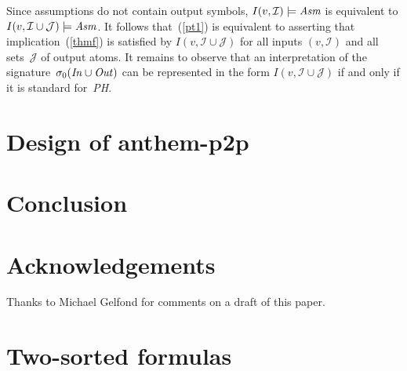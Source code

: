 \documentclass{article}
\newcommand{\I}{\mathcal{I}}
\newcommand{\J}{\mathcal{J}}
\begin{document}
Since assumptions do not contain output symbols,
$I(v,\I)\models\emph{Asm}$ is equivalent to $I(v,\I\cup\J)\models\emph{Asm}$.
It follows that~(\ref{pt1}) is equivalent to asserting that
implication~(\ref{thmf}) is satisfied by $I(v,\I\cup\J)$ for all
inputs $(v,\I)$ and all sets~$\J$ of output atoms.  It remains to observe
that an interpretation of the
signature~$\sigma_0(\emph{In\/}\cup\emph{Out\/})$ can be represented in
the form $I(v,\I\cup\J)$ if and only if it is
standard for~\emph{PH}.

\section{Design of {\sc anthem-p2p}} \label{sec:ontop}

\section{Conclusion}

\section*{Acknowledgements}

Thanks to Michael Gelfond for comments on a draft of this paper.




\appendix

\section{Two-sorted formulas} \label{appa}
\end{document}
